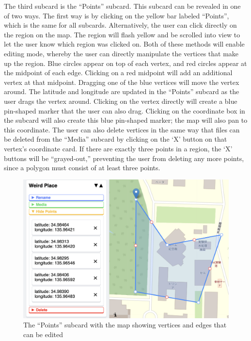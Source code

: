 \documentclass[a4paper, 10pt, american, titlepage]{article}
\begin{document}
The third subcard is the ``Points'' subcard. This subcard can be revealed in
one of two ways. The first way is by clicking on the yellow bar labeled
``Points'', which is the same for all subcards. Alternatively, the user can
click directly on the region on the map. The region will flash yellow and be
scrolled into view to let the user know which region was clicked on. Both of
these methods will enable editing mode, whereby the user can directly
manipulate the vertices that make up the region. Blue circles appear on top of
each vertex, and red circles appear at the midpoint of each edge. Clicking on a
red midpoint will add an additional vertex at that midpoint. Dragging one of
the blue vertices will move the vertex around. The latitude and longitude are
updated in the ``Points'' subcard as the user drags the vertex around. Clicking
on the vertex directly will create a blue pin-shaped marker that the user can
also drag. Clicking on the coordinate box in the subcard will also create this
blue pin-shaped marker; the map will also pan to this coordinate. The user can
also delete vertices in the same way that files can be deleted from the
``Media'' subcard by clicking on the `X' button on that vertex's coordinate
card. If there are exactly three points in a region, the `X' buttons will be
``grayed-out,'' preventing the user from deleting any more points, since a
polygon must consist of at least three points.

\begin{figure}[h]
	\centering
    \includegraphics[width=\textwidth]{edit-subcard-with-map-editour.png}
    \caption{The ``Points'' subcard with the map showing vertices and edges that
    can be edited}
	\label{fig:editSubcardWithMap}
\end{figure}
\end{document}
